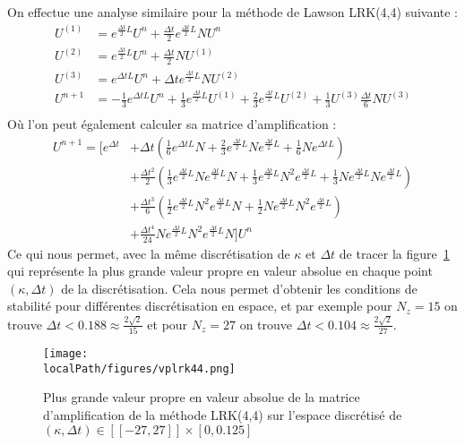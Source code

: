 On effectue une analyse similaire pour la méthode de Lawson LRK(4,4) suivante :
$$
  \begin{aligned}
    U^{(1)} &= e^{\frac{\Delta t}{2}L}U^n + \frac{\Delta t}{2}e^{\frac{\Delta t}{2}L}NU^n \\
    U^{(2)} &= e^{\frac{\Delta t}{2}L}U^n + \frac{\Delta t}{2}NU^{(1)} \\
    U^{(3)} &= e^{\Delta tL}U^n + \Delta te^{\frac{\Delta t}{2}L}NU^{(2)} \\
    U^{n+1} &= -\frac{1}{3}e^{\Delta tL}U^n + \frac{1}{3}e^{\frac{\Delta t}{2}L}U^{(1)} + \frac{2}{3}e^{\frac{\Delta t}{2}L}U^{(2)} + \frac{1}{3}U^{(3)} \frac{\Delta t}{6}NU^{(3)} \\
  \end{aligned}
$$
Où l'on peut également calculer sa matrice d'amplification :
$$
  \begin{aligned}
    U^{n+1} = \Big[ e^{\Delta t} 
              & + \Delta t\left( \frac{1}{6}e^{\Delta t L}N + \frac{2}{3}e^{\frac{\Delta t}{2}L}Ne^{\frac{\Delta t}{2}L} + \frac{1}{6}Ne^{\Delta t L} \right) \\
              & + \frac{\Delta t^2}{2} \left( \frac{1}{3}e^{\frac{\Delta t}{2}L}Ne^{\frac{\Delta t}{2}L}N + \frac{1}{3}e^{\frac{\Delta t}{2}L}N^2e^{\frac{\Delta t}{2}L} + \frac{1}{3}Ne^{\frac{\Delta t}{2}L}Ne^{\frac{\Delta t}{2}L} \right) \\
              & + \frac{\Delta t^3}{6} \left( \frac{1}{2}e^{\frac{\Delta t}{2}L}N^2e^{\frac{\Delta t}{2}L}N + \frac{1}{2}Ne^{\frac{\Delta t}{2}L}N^2e^{\frac{\Delta t}{2}L} \right) \\
              & + \frac{\Delta t^4}{24}Ne^{\frac{\Delta t}{2}L}N^2e^{\frac{\Delta t}{2}L}N \Big]U^n
  \end{aligned}
$$
Ce qui nous permet, avec la même discrétisation de $\kappa$ et $\Delta t$ de tracer la figure~\ref{fig:3:vplrk44} qui représente la plus grande valeur propre en valeur absolue en chaque point $(\kappa,\Delta t)$ de la discrétisation. Cela nous permet d'obtenir les conditions de stabilité pour différentes discrétisation en espace, et par exemple pour $N_z = 15$ on trouve $\Delta t<0.188 \approx \frac{2\sqrt{2}}{15}$ et pour $N_z = 27$ on trouve $\Delta t < 0.104 \approx \frac{2\sqrt{2}}{27}$.
\begin{figure}[h]
  \centering
  \texttt{[image: \\localPath/figures/vplrk44.png]}
  \caption{Plus grande valeur propre en valeur absolue de la matrice d'amplification de la méthode LRK(4,4) sur l'espace discrétisé de $(\kappa,\Delta t)\in[\![-27,27]\!]\times[0,0.125]$}
  \label{fig:3:vplrk44}
\end{figure}


